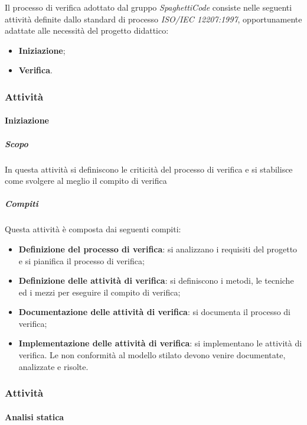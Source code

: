 Il processo di verifica adottato dal gruppo \emph{SpaghettiCode} consiste nelle seguenti attività definite dallo standard di processo \emph{ISO/IEC 12207:1997}, opportunamente adattate alle necessità del progetto didattico:
\begin{itemize}
	\item \textbf{Iniziazione};
	\item \textbf{Verifica}.
\end{itemize}

\subsubsection{Attività}

\paragraph{Iniziazione}
\label{par:iniziazione}
\subparagraph{Scopo}
\label{par:iniziazione:scopo}
In questa attività si definiscono le criticità del processo di verifica e si stabilisce come svolgere al meglio il compito di verifica\\
\subparagraph{Compiti}
\label{par:iniziazione:compiti}
Questa attività è composta dai seguenti compiti:
\begin{itemize}
    \item \textbf{Definizione del processo di verifica}: si analizzano i requisiti del progetto e si pianifica il processo di verifica;
    \item \textbf{Definizione delle attività di verifica}: si definiscono i metodi, le tecniche ed i mezzi per eseguire il compito di verifica;
    \item \textbf{Documentazione delle attività di verifica}: si documenta il processo di verifica;
    \item \textbf{Implementazione delle attività di verifica}: si implementano le attività di verifica. Le non conformità al modello stilato devono venire documentate, analizzate e risolte.
\end{itemize}


\subsubsection{Attività}
\paragraph{Analisi statica}
\label{par:verifica:analisi_statica}

